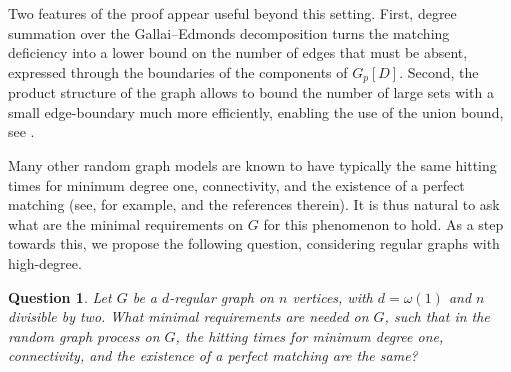 \documentclass[10pt,a4paper]{article}
\newtheorem{question}[thm]{Question}
\begin{document}
Two features of the proof appear useful beyond this setting.
First, degree summation over the Gallai--Edmonds decomposition turns the matching deficiency into a lower bound on the number of edges that must be absent, expressed through the boundaries of the components of $G_p[D]$. 
Second, the product structure of the graph allows to bound the number of large sets with a small edge-boundary much more efficiently, enabling the use of the union bound, see .


Many other random graph models are known to have typically the same hitting times for minimum degree one, connectivity, and the existence of a perfect matching (see, for example, \cite{FP04} and the references therein). It is thus natural to ask what are the minimal requirements on $G$ for this phenomenon to hold. As a step towards this, we propose the following question, considering regular graphs with high-degree.
\begin{question}
    Let $G$ be a $d$-regular graph on $n$ vertices, with $d=\omega(1)$ and $n$ divisible by two. What minimal requirements are needed on $G$, such that in the random graph process on $G$, the hitting times for minimum degree one, connectivity, and the existence of a perfect matching are the same?
\end{question}

\end{document}
